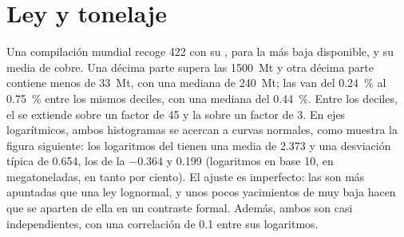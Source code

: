 \section{Ley y tonelaje}\label{sec:b2:ore-deposits:grade-tonnage}

Una compilación mundial recoge 422  con su , para la  más baja
disponible, y su  media de cobre. Una décima parte supera las \qty{1500}{Mt} y otra décima parte contiene menos
de \qty{33}{Mt}, con una mediana de \qty{240}{Mt}; las  van del \qty{0.24}{\percent} al
\qty{0.75}{\percent} entre los mismos deciles, con una mediana del \qty{0.44}{\percent}. Entre los
deciles, el  se extiende sobre un factor de 45 y la  sobre un factor de 3. En ejes logarítmicos, ambos histogramas se acercan a curvas normales, como muestra la figura siguiente:
los logaritmos del  tienen una media de 2.373 y una desviación típica de 0.654, los de la 
$-0.364$ y 0.199 (logaritmos en base 10,  en megatoneladas,  en tanto por ciento). El ajuste es
imperfecto: las  son más apuntadas que una ley lognormal, y unos pocos yacimientos de  muy baja hacen
que se aparten de ella en un contraste formal. Además, ambos son casi independientes, con una correlación de
0.1 entre sus logaritmos.

